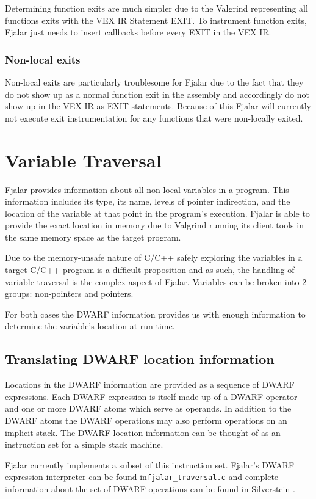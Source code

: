 \documentclass{article}
\begin{document}
Determining function exits are much simpler due to the Valgrind
representing all functions exits with the VEX IR Statement EXIT. To
instrument function exits, Fjalar just needs to insert callbacks
before every EXIT in the VEX IR.

\subsubsection{Non-local exits}
Non-local exits are particularly troublesome for Fjalar due to the
fact that they do not show up as a normal function exit in the
assembly and accordingly do not show up in the VEX IR as EXIT
statements. Because of this Fjalar will currently not execute exit
instrumentation for any functions that were non-locally exited.

\section{Variable Traversal}
Fjalar provides information about all non-local variables in a
program. This information includes its type, its name, levels of
pointer indirection, and the location of the variable at that point in
the program's execution. Fjalar is able to provide the exact location 
in memory due to Valgrind running its client tools in the same memory
space as the target program.

Due to the memory-unsafe nature of C/C++ safely exploring the
variables in a target C/C++ program is a difficult
proposition and as such, the handling of variable traversal is the
complex aspect of Fjalar. Variables can be broken into 2 groups:
non-pointers and pointers.

For both cases the DWARF information provides us with enough
information to determine the variable's location at run-time.

\subsection{Translating DWARF location information}
Locations in the DWARF information are provided as a sequence of DWARF
expressions. Each DWARF expression is itself made up of a DWARF
operator and one or more DWARF atoms which serve as operands. In
addition to the DWARF atoms the DWARF operations may also perform
operations on an implicit stack. The DWARF location information 
can be thought of as an instruction set for a simple stack machine.

Fjalar currently implements a subset of this instruction set. Fjalar's
DWARF expression interpreter can be found
in\texttt{fjalar\_traversal.c} and complete information about the set
of DWARF operations can be found in Silverstein
\cite{silverstein1993dwarf}.
\end{document}
